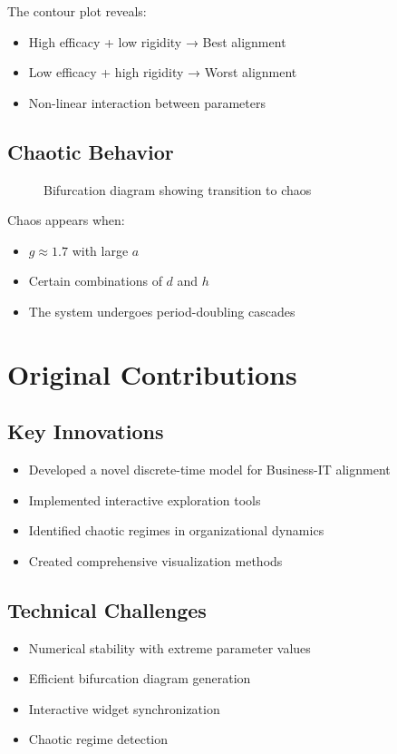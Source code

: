 \documentclass[a4paper, 12pt]{article}
\begin{document}
The contour plot reveals:
\begin{itemize}
	\item High efficacy + low rigidity → Best alignment
	\item Low efficacy + high rigidity → Worst alignment
	\item Non-linear interaction between parameters
\end{itemize}

\subsection{Chaotic Behavior}
\begin{figure}[h]
	\centering
	\caption{Bifurcation diagram showing transition to chaos}
\end{figure}

Chaos appears when:
\begin{itemize}
	\item $g \approx 1.7$ with large $a$
	\item Certain combinations of $d$ and $h$
	\item The system undergoes period-doubling cascades
\end{itemize}

\section{Original Contributions}
\subsection{Key Innovations}
\begin{itemize}
	\item Developed a novel discrete-time model for Business-IT alignment
	\item Implemented interactive exploration tools
	\item Identified chaotic regimes in organizational dynamics
	\item Created comprehensive visualization methods
\end{itemize}

\subsection{Technical Challenges}
\begin{itemize}
	\item Numerical stability with extreme parameter values
	\item Efficient bifurcation diagram generation
	\item Interactive widget synchronization
	\item Chaotic regime detection
\end{itemize}
\end{document}
